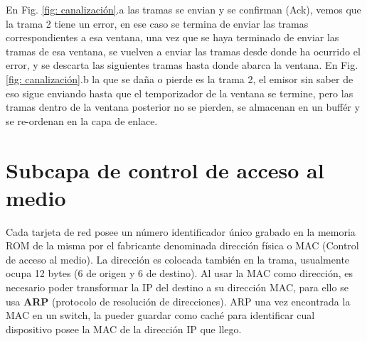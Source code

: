 \documentclass[
	12pt, %
	fleqn, %
	a4paper, %
	oneside, %
]{LegrandOrangeBook}
\begin{document}
En Fig. \ref{fig: canalización}.a las tramas se envian y se confirman (Ack), vemos que la trama 2 tiene un error, en ese caso se termina de enviar las tramas correspondientes a esa ventana, una vez que se haya terminado de enviar las tramas de esa ventana, se vuelven a enviar las tramas desde donde ha ocurrido el error, y se descarta las siguientes tramas hasta donde abarca la ventana. En Fig. \ref{fig: canalización}.b la que se daña o pierde es la trama 2, el emisor sin saber de eso sigue enviando hasta que el temporizador de la ventana se termine, pero las tramas dentro de la ventana posterior no se pierden, se almacenan en un buffér y se re-ordenan en la capa de enlace.
\chapter{Subcapa de control de acceso al medio}
Cada tarjeta de red posee un número identificador único grabado en la memoria ROM de la misma por el fabricante denominada dirección física o MAC (Control de acceso al medio). La dirección es colocada también en la trama, usualmente ocupa 12 bytes (6 de origen y 6 de destino). Al usar la MAC como dirección, es necesario poder transformar la IP del destino a su dirección MAC, para ello se usa \textbf{ARP} (protocolo de resolución de direcciones). ARP una vez encontrada la MAC en un switch, la pueder guardar como caché para identificar cual dispositivo posee la MAC de la dirección IP que llego.
\end{document}
